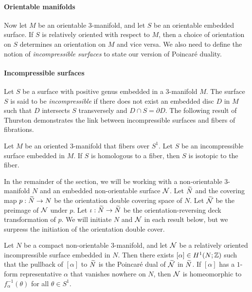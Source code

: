 \paragraph{Orientable manifolds} Now let $M$ be an orientable 3-manifold, and let $S$ be an orientable embedded surface.  If $S$ is relatively oriented with respect to $M$, then a choice of orientation on $S$ determines an orientation on $M$ and vice versa.
We also need to define the notion of \emph{incompressible surfaces} to state our version of Poincar\'e duality.

\paragraph{Incompressible surfaces}
  Let $S$ be a surface with positive genus embedded in a $3$-manifold $M$.
  The surface $S$ is said to be \emph{incompressible} if there does not exist an embedded disc $D$ in $M$ such that $D$ intersects $S$ transversely and $D \cap S = \partial D$.
  The following result of Thurston demonstrates the link between incompressible surfaces and fibers of fibrations.

\begin{thm}
  \label{thm:Thur2}
Let $M$ be an oriented 3-manifold that fibers over $S^1$.  Let $S$ be an incompressible surface embedded in $M$.  If $S$ is homologous to a fiber, then $S$ is isotopic to the fiber.
\end{thm}



In the remainder of the section, we will be working with a non-orientable 3-manifold $N$ and an embedded non-orientable surface $\mathcal{N}$.   Let $\widetilde{N}$ and the covering map $p:\widetilde{N}\rightarrow N$ be the orientation double covering space of $N$.  Let $\widetilde{\mathcal{N}}$ be the preimage of $\mathcal{N}$ under $p$.  Let $\iota:\widetilde{N}\rightarrow\widetilde{N}$ be the orientation-reversing deck transformation of $p$.  We will initiate $N$ and $\mathcal{N}$ in each result below, but we surpress the initiation of the orientation double cover.

\begin{thm}
  \label{thm:strong-duality}
  Let $N$ be a compact non-orientable $3$-manifold, and let $\mathcal{N}$ be a relatively oriented incompressible surface embedded in $N$.
  Then there exists $[\alpha] \in H^1(N; \mathbb{Z})$ such that the pullback of $[\alpha]$ to $\widetilde{N}$ is the Poincar\'e dual of $\widetilde{\mathcal{N}}$ in $\widetilde{N}$.
  If $[\alpha]$ has a $1$-form representative $\alpha$ that vanishes nowhere on $N$, then $\mathcal{N}$ is homeomorphic to $f_{\alpha}^{-1}(\theta)$ for all $\theta \in S^1$.
\end{thm}

